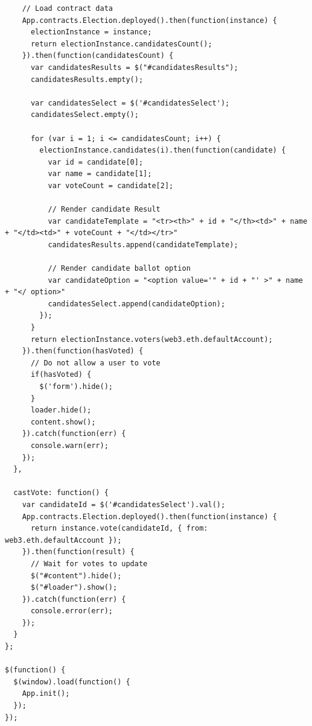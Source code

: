 \documentclass{report}
\begin{document}
\begin{enumerate}
\begin{verbatim}
    // Load contract data
    App.contracts.Election.deployed().then(function(instance) {
      electionInstance = instance;
      return electionInstance.candidatesCount();
    }).then(function(candidatesCount) {
      var candidatesResults = $("#candidatesResults");
      candidatesResults.empty();

      var candidatesSelect = $('#candidatesSelect');
      candidatesSelect.empty();

      for (var i = 1; i <= candidatesCount; i++) {
        electionInstance.candidates(i).then(function(candidate) {
          var id = candidate[0];
          var name = candidate[1];
          var voteCount = candidate[2];

          // Render candidate Result
          var candidateTemplate = "<tr><th>" + id + "</th><td>" + name + "</td><td>" + voteCount + "</td></tr>"
          candidatesResults.append(candidateTemplate);

          // Render candidate ballot option
          var candidateOption = "<option value='" + id + "' >" + name + "</ option>"
          candidatesSelect.append(candidateOption);
        });
      }
      return electionInstance.voters(web3.eth.defaultAccount);
    }).then(function(hasVoted) {
      // Do not allow a user to vote
      if(hasVoted) {
        $('form').hide();
      }
      loader.hide();
      content.show();
    }).catch(function(err) {
      console.warn(err);
    });
  },

  castVote: function() {
    var candidateId = $('#candidatesSelect').val();
    App.contracts.Election.deployed().then(function(instance) {
      return instance.vote(candidateId, { from: web3.eth.defaultAccount });
    }).then(function(result) {
      // Wait for votes to update
      $("#content").hide();
      $("#loader").show();
    }).catch(function(err) {
      console.error(err);
    });
  }
};

$(function() {
  $(window).load(function() {
    App.init();
  });
});
      
\end{verbatim}
\cite{WinNT55}
  
\end{enumerate}
\end{document}
